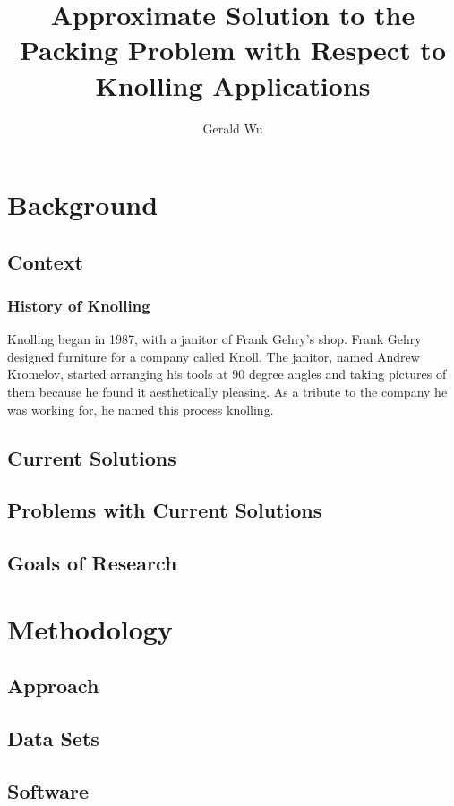 \documentclass[11pt,letterpaper]{article}
\begin{document}
	\setlength{\parskip}{1em}
	\title{Approximate Solution to the Packing Problem with Respect to Knolling Applications}
	\author{Gerald Wu}
	\maketitle
	\tableofcontents

	\section{Background}
	\subsection{Context}
	\subsubsection{History of Knolling}
	Knolling began in 1987, with a janitor of Frank Gehry's shop. Frank Gehry designed furniture for a company called Knoll. The janitor, named Andrew Kromelov, started arranging his tools at 90 degree angles and taking pictures of them because he found it aesthetically pleasing. As a tribute to the company he was working for, he named this process knolling.
	\subsection{Current Solutions}
	\subsection{Problems with Current Solutions}
	\subsection{Goals of Research}

	\section{Methodology}
	\subsection{Approach}
	\subsection{Data Sets}
	\subsection{Software}
\end{document}
